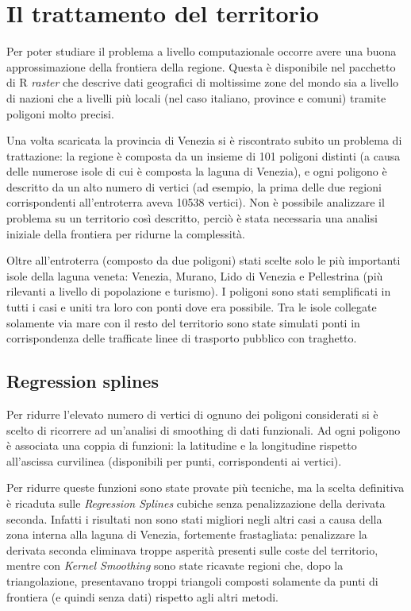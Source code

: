 \documentclass[a4paper,11pt,twoside,openright]{book}							%
\begin{document}
\section{Il trattamento del territorio}

Per poter studiare il problema a livello computazionale occorre avere una buona approssimazione della frontiera della regione. Questa è disponibile nel pacchetto di R \textit{raster} che descrive dati geografici di moltissime zone del mondo sia a livello di nazioni che a livelli più locali (nel caso italiano, province e comuni) tramite poligoni molto precisi.

Una volta scaricata la provincia di Venezia si è riscontrato subito un problema di trattazione: la regione è composta da un insieme di 101 poligoni distinti (a causa delle numerose isole di cui è composta la laguna di Venezia), e ogni poligono è descritto da un alto numero di vertici (ad esempio, la prima delle due regioni corrispondenti all'entroterra aveva 10538 vertici). Non è possibile analizzare il problema su un territorio così descritto, perciò è stata necessaria una analisi iniziale della frontiera per ridurne la complessità.

Oltre all'entroterra (composto da due poligoni) stati scelte solo le più importanti isole della laguna veneta: Venezia, Murano, Lido di Venezia e Pellestrina (più rilevanti a livello di popolazione e turismo). I poligoni sono stati semplificati in tutti i casi e uniti tra loro con ponti dove era possibile. Tra le isole collegate solamente via mare con il resto del territorio sono state simulati ponti in corrispondenza delle trafficate linee di trasporto pubblico con traghetto.

\subsection*{Regression splines}

Per ridurre l'elevato numero di vertici di ognuno dei poligoni considerati si è scelto di ricorrere ad un'analisi di smoothing di dati funzionali. Ad ogni poligono è associata una coppia di funzioni: la latitudine e la longitudine rispetto all'ascissa curvilinea (disponibili per punti, corrispondenti ai vertici).

Per ridurre queste funzioni sono state provate più tecniche, ma la scelta definitiva è ricaduta sulle \textit{Regression Splines} cubiche senza penalizzazione della derivata seconda. Infatti i risultati non sono stati migliori negli altri casi a causa della zona interna alla laguna di Venezia, fortemente frastagliata: penalizzare la derivata seconda eliminava troppe asperità presenti sulle coste del territorio, mentre con \textit{Kernel Smoothing} sono state ricavate regioni che, dopo la triangolazione, presentavano troppi triangoli composti solamente da punti di frontiera (e quindi senza dati) rispetto agli altri metodi.
\end{document}
